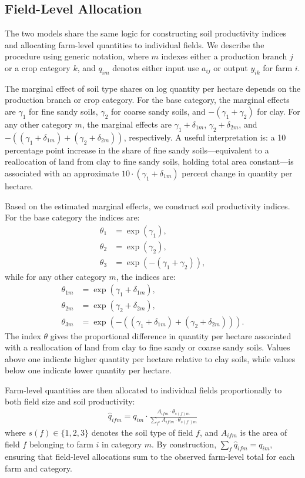 \documentclass{scrartcl}
\begin{document}
\subsection*{Field-Level Allocation}
The two models share the same logic for constructing soil productivity indices and allocating farm-level quantities to individual fields.
We describe the procedure using generic notation, where $m$ indexes either a production branch $j$ or a crop category $k$, and $q_{im}$ denotes either input use $a_{ij}$ or output $y_{ik}$ for farm $i$.

The marginal effect of soil type shares on log quantity per hectare depends on the production branch or crop category.
For the base category, the marginal effects are $\gamma_1$ for fine sandy soils, $\gamma_2$ for coarse sandy soils, and $-(\gamma_1+\gamma_2)$ for clay.
For any other category $m$, the marginal effects are $\gamma_1 + \delta_{1m}$, $\gamma_2 + \delta_{2m}$, and $-((\gamma_1 + \delta_{1m})+(\gamma_2 + \delta_{2m}))$, respectively.
A useful interpretation is: a 10 percentage point increase in the share of fine sandy soils---equivalent to a reallocation of land from clay to fine sandy soils, holding total area constant---is associated with an approximate $10 \cdot (\gamma_1 + \delta_{1m})$ percent change in quantity per hectare.

Based on the estimated marginal effects, we construct soil productivity indices.
For the base category the indices are:
\begin{align}
    \theta_1 & = \exp(\gamma_1), \\
    \theta_2 & = \exp(\gamma_2), \\
    \theta_3 & = \exp(-(\gamma_1 + \gamma_2)),
\end{align}
while for any other category $m$, the indices are:
\begin{align}
    \theta_{1m} & = \exp(\gamma_1 + \delta_{1m}), \\
    \theta_{2m} & = \exp(\gamma_2 + \delta_{2m}), \\
    \theta_{3m} & = \exp(-((\gamma_1 + \delta_{1m}) + (\gamma_2 + \delta_{2m}))).
\end{align}
The index $\theta$ gives the proportional difference in quantity per hectare associated with a reallocation of land from clay to fine sandy or coarse sandy soils.
Values above one indicate higher quantity per hectare relative to clay soils, while values below one indicate lower quantity per hectare.

Farm-level quantities are then allocated to individual fields proportionally to both field size and soil productivity:
\begin{align}
    \hat{q}_{ifm} = q_{im} \cdot \frac{A_{ifm} \cdot \theta_{s(f)m}}
    {\sum_{f'} A_{if'm} \cdot \theta_{s(f')m}}
    \label{eq:allocation}
\end{align}
where $s(f) \in \{1, 2, 3\}$ denotes the soil type of field $f$, and $A_{ifm}$ is the area of field $f$ belonging to farm $i$ in category $m$.
By construction, $\sum_f \hat{q}_{ifm} = q_{im}$, ensuring that field-level allocations sum to the observed farm-level total for each farm and category.
\end{document}

